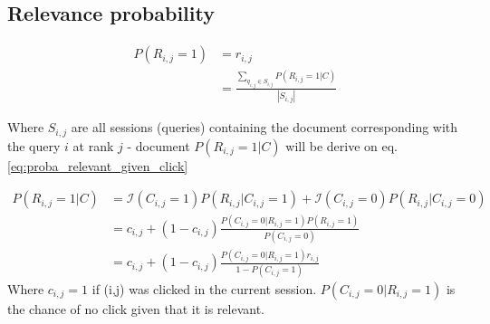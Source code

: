 \subsection{Relevance probability}
\begin{align*}
P(R_{i,j} = 1)
&= r_{i,j} \\
&= \frac{\sum_{q_{i,j} \in S_{i,j}} P(R_{i,j}=1 | C)}{|S_{i,j}|}
\end{align*}

Where $S_{i,j}$ are all sessions (queries) containing the document corresponding with the query $i$ at rank $j$ - document
$P(R_{i,j}=1 | C)$ will be derive on eq.\ref{eq:proba_relevant_given_click}

\begin{align}
P(R_{i,j}=1 | C)
&= \mathcal{I}(C_{i,j} = 1) P(R_{i,j}|C_{i,j}=1) + \mathcal{I}(C_{i,j} = 0) P(R_{i,j}|C_{i,j}=0)  \nonumber\\
&= c_{i,j} + (1-c_{i,j}) \frac {P(C_{i,j}=0|R_{i,j}=1) P(R_{i,j} = 1)} {P(C_{i,j} = 0)}  \nonumber\\
&= c_{i,j} + (1-c_{i,j}) \frac {P(C_{i,j}=0|R_{i,j}=1) r_{i,j}} { 1 - P(C_{i,j} = 1)}
\label{eq:proba_relevant_given_click}
\end{align}
Where $c_{i,j} = 1$ if (i,j) was clicked in the current session.
$P(C_{i,j}=0|R_{i,j}=1)$ is the chance of no click given that it is relevant. 

